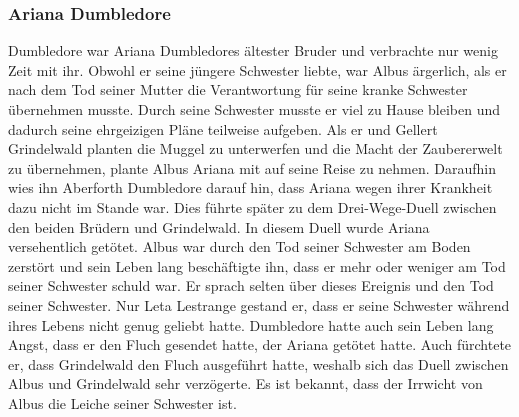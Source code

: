 \documentclass[a4paper, 10pt]{article}
\begin{document}
\subsubsection*{Ariana Dumbledore}
Dumbledore war Ariana Dumbledores ältester Bruder und verbrachte nur wenig Zeit mit ihr. Obwohl er seine jüngere Schwester liebte, war Albus ärgerlich, als er nach dem Tod seiner Mutter die Verantwortung für seine kranke Schwester übernehmen musste. Durch seine Schwester musste er viel zu Hause bleiben und dadurch seine ehrgeizigen Pläne teilweise aufgeben. Als er und Gellert Grindelwald planten die Muggel zu unterwerfen und die Macht der Zaubererwelt zu übernehmen, plante Albus Ariana mit auf seine Reise zu nehmen. Daraufhin wies ihn Aberforth Dumbledore darauf hin, dass Ariana wegen ihrer Krankheit dazu nicht im Stande war. Dies führte später zu dem Drei-Wege-Duell zwischen den beiden Brüdern und Grindelwald. In diesem Duell wurde Ariana versehentlich getötet. Albus war durch den Tod seiner Schwester am Boden zerstört und sein Leben lang beschäftigte ihn, dass er mehr oder weniger am Tod seiner Schwester schuld war. Er sprach selten über dieses Ereignis und den Tod seiner Schwester. Nur Leta Lestrange gestand er, dass er seine Schwester während ihres Lebens nicht genug geliebt hatte. Dumbledore hatte auch sein Leben lang Angst, dass er den Fluch gesendet hatte, der Ariana getötet hatte. Auch fürchtete er,
dass Grindelwald den Fluch ausgeführt hatte, weshalb sich das Duell zwischen Albus und Grindelwald sehr verzögerte. Es ist bekannt, dass der Irrwicht von Albus die Leiche seiner Schwester ist.
\end{document}
